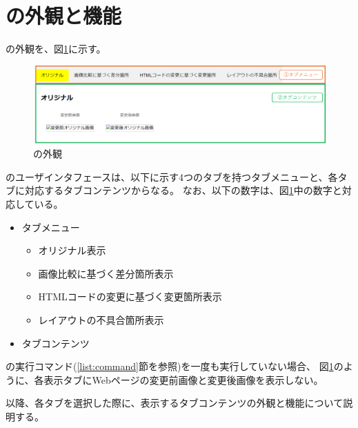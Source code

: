 \section{\toolName の外観と機能}\label{sec:MixVRT_Appearance}
\toolName の外観を、図\ref{fig: Appearance}に示す。
\begin{figure}[tp]
    \begin{center}
        \includegraphics[width=1.0\columnwidth]{image/App.png}
        \caption{\toolName の外観}
        \label{fig: Appearance}
    \end{center}
\end{figure}
\toolName のユーザインタフェースは、以下に示す4つのタブを持つタブメニューと、各タブに対応するタブコンテンツからなる。
なお、以下の数字は、図\ref{fig: Appearance}中の数字と対応している。
\begin{itemize}
    \item[①] タブメニュー
          \begin{itemize}
              \item オリジナル表示
              \item 画像比較に基づく差分箇所表示
              \item HTMLコードの変更に基づく変更箇所表示
              \item レイアウトの不具合箇所表示
          \end{itemize}
    \item[②] タブコンテンツ
\end{itemize}
\par
\toolName の実行コマンド(\ref{list:command}節を参照)を一度も実行していない場合、
図\ref{fig: Appearance}のように、各表示タブにWebページの変更前画像と変更後画像を表示しない。
\par
以降、各タブを選択した際に、表示するタブコンテンツの外観と機能について説明する。

